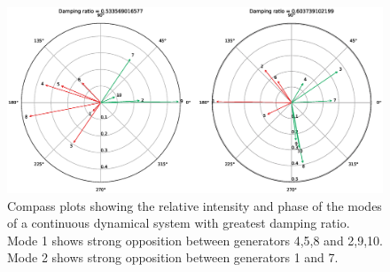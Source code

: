 \documentclass[11pt,a4paper]{article}
\begin{document}
\begin{figure}[H]
	\centering
		\includegraphics[scale=0.45]{compass}
	\caption{Compass plots showing the relative intensity and phase of the modes of a continuous dynamical system with greatest damping ratio. Mode 1 shows strong opposition between generators 4,5,8 and 2,9,10. Mode 2 shows strong opposition between generators 1 and 7.}
	\label{compass}
\end{figure}
\end{document}
